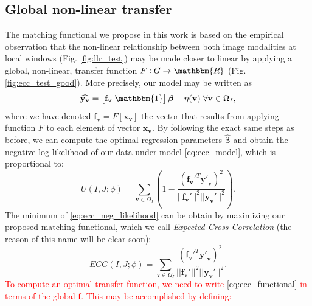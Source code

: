 \subsection{Global non-linear transfer}
The matching functional we propose in this work is based on the empirical observation that the non-linear relationship between both image modalities at local windows (Fig. \ref{fig:llr_test}) may be made closer to linear by applying a global, non-linear, transfer function $F: G \rightarrow \mathbbm{R}$ (Fig. \ref{fig:ecc_test_good}). More precisely, our model may be written as
\begin{equation}\label{eq:ecc_model}
\widehat{\mathbf{y}_{\mathbf{v}}} = \left[\mathbf{f_{v}} \; \mathbbm{1}\right]\boldsymbol{\beta} + \eta(\mathbf{v}) \; \forall \mathbf{v}\in\Omega_{I},
\end{equation}
where we have denoted $\mathbf{f_{v}} = F[\mathbf{x}_{\mathbf{v}}]$ the vector that results from applying function $F$ to each element of vector $\mathbf{x}_{\mathbf{v}}$. By following the exact same steps as before, we can compute the optimal regression parameters $\widehat{\boldsymbol{\beta}}$ and obtain the negative log-likelihood of our data under model \eqref{eq:ecc_model}, which is proportional to:
\begin{equation}\label{eq:ecc_neg_likelihood}
    U(I, J;\phi) = \sum_{\mathbf{v} \in \Omega_{I}} \left( 1 - \frac{(\mathbf{f_{v}'}^{T} \mathbf{y'}_{\mathbf{v}})^{2}}{||\mathbf{f_{v}'}||^{2}||\mathbf{y_{v}'}||^{2}}\right).
\end{equation}
The minimum of \eqref{eq:ecc_neg_likelihood} can be obtain by maximizing our proposed matching functional, which we call \emph{Expected Cross Correlation} (the reason of this name will be clear soon):
\begin{equation}\label{eq:ecc_functional}
    ECC(I, J;\phi) = \sum_{\mathbf{v} \in \Omega_{I}} \frac{(\mathbf{f_{v}'}^{T} \mathbf{y'}_{\mathbf{v}})^{2}}{||\mathbf{f_{v}'}||^{2}||\mathbf{y_{v}'}||^{2}}.
\end{equation}
\textcolor{red}{To compute an optimal transfer function, we need to write \eqref{eq:ecc_functional} in terms of the global $\mathbf{f}$. This may be accomplished by defining:}
